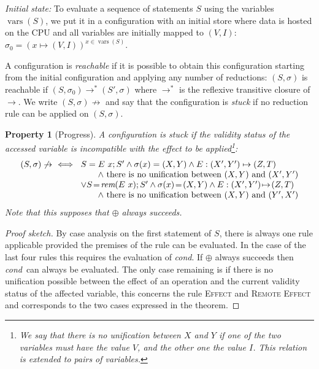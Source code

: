 \documentclass[preprint,12pt]{elsarticle}
\newcommand{\symb}[1]{\textit{#1}}
\newcommand{\cond}{\symb{cond}}
\DeclareMathOperator{\vars}{vars}
\newcommand{\rem}[1]{\symb{rem}(#1)}
\newtheorem{Property}{Property}
\begin{document}
\noindent\emph{Initial state:} To evaluate a sequence of statements $S$ using the 
variables 
$\vars(S)$, we put it in a configuration with 
an initial 
store where data is hosted on the CPU and all variables are initially mapped to $(V,I)$: 
$\sigma_0=(x\mapsto 
(V,I))^{x\in \vars(S)}$.



A configuration is \emph{reachable} if it is possible to obtain this configuration 
starting from the initial configuration and applying any number of reductions: 
$(S,\sigma)$ is reachable if $(S,\sigma_0)\to^*(S',\sigma)$ where $\to^*$ is the 
reflexive 
transitive closure of $\to$. We write $(S,\sigma)\not\to $ and say that the configuration 
is \emph{stuck} if no reduction rule can be 
applied on $(S,\sigma)$.
\begin{Property}[Progress]\label{prop:stuck}
 A configuration is stuck if the validity status of the accessed variable is 
incompatible with the effect to be applied\footnote{We say that there is no unification  between $X$ and $Y$ if one of the two variables must have the value $V$, and the other one the value $I$. This relation is extended to pairs of variables.}:
\[\begin{array}{@{}l@{}}
(S,\sigma)\not\to\ \iff~
 \begin{array}[t]{@{}l@{}}
S=E~x;S' \land \sigma(x)=(X,Y) 
							\land E:  (X',Y')\mapsto (Z,T)\ 
						\\\qquad 	\land~\text{there is no unification  between } 
							(X,Y)   
							\text{ and } (X',Y')\\
\lor S\!=\!\rem{E~x};S' \land \sigma(x)\!=\!(X,Y) 
							\land E:  (X',Y')\!\mapsto\! (Z,T)\ 
							\\\qquad \land~\text{there is no unification  between } 
							(X,Y)   
							\text{ and } (Y',X')		
\end{array}
\end{array}\]
Note that this supposes that $\oplus$ always succeeds.
\end{Property}
\begin{proof}[Proof sketch]
By case analysis on the first statement of $S$, there is always 
one rule applicable provided the premises of the rule can be evaluated.
In the case of the last four rules this requires the evaluation of \cond. If $\oplus$ 
always succeeds then \cond\ can always be 
evaluated. The only case remaining is if there is no unification possible between the 
effect of an operation and the current validity status of the affected variable, this 
concerns the rule \textsc{Effect} and \textsc{Remote Effect} and corresponds to the two 
cases expressed in the theorem.
\end{proof}
\end{document}
